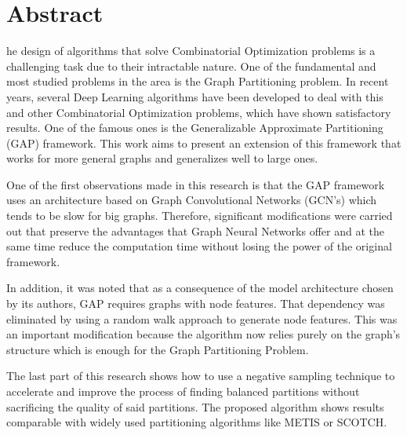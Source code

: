 

\chapter*{Abstract}

he design of algorithms that solve Combinatorial Optimization problems is a challenging task due to their intractable nature. One of the fundamental and most studied problems in the area is the Graph Partitioning problem. In recent years, several Deep Learning algorithms have been developed to deal with this and other Combinatorial Optimization problems, which have shown satisfactory results. One of the famous ones is the Generalizable Approximate Partitioning (GAP) framework. This work aims to present an extension of this framework that works for more general graphs and generalizes well to large ones.

One of the first observations made in this research is that the GAP framework uses an architecture based on Graph Convolutional Networks (GCN's) which tends to be slow for big graphs. Therefore, significant modifications were carried out that preserve the advantages that Graph Neural Networks offer and at the same time reduce the computation time without losing the power of the original framework.

In addition, it was noted that as a consequence of the model architecture chosen by its authors, GAP requires graphs with node features. That dependency was eliminated by using a random walk approach to generate node features. This was an important modification because the algorithm now relies purely on the graph's structure which is enough for the Graph Partitioning Problem.

The last part of this research shows how to use a negative sampling technique to accelerate and improve the process of finding balanced partitions without sacrificing the quality of said partitions. The proposed algorithm shows results comparable with widely used partitioning algorithms like METIS or SCOTCH.

\clearpage